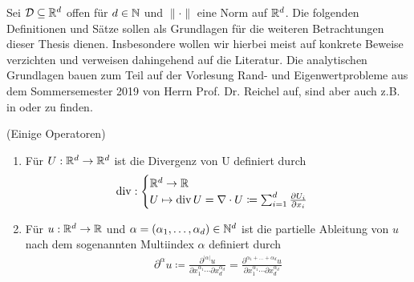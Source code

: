 Sei $\mathcal{D} \subseteq \mathbb{R}^d$ offen für $d\in \mathbb{N}$ und $\lVert \cdot \rVert$ eine Norm auf $\mathbb{R}^d$.
Die folgenden Definitionen und Sätze sollen als Grundlagen für die weiteren Betrachtungen dieser Thesis dienen. Insbesondere wollen wir hierbei meist auf konkrete Beweise verzichten und verweisen dahingehend auf die Literatur. 
Die analytischen Grundlagen bauen zum Teil auf der Vorlesung Rand- und Eigenwertprobleme aus dem Sommersemester 2019 von Herrn Prof. Dr. Reichel auf, sind aber auch  z.B. in \cite{dobrowolski2010angewandte} oder \cite{evans10} zu finden.
\begin{Definition}(Einige Operatoren)
	\begin{enumerate}[label=(\alph*)]
		\item Für $U: \mathbb{R}^d \to \mathbb{R}^d$ ist die Divergenz von U definiert durch
			\begin{align*}
				\operatorname{div}  : \begin{cases}
				\mathbb{R}^d  \to \mathbb{R} \\
				U \mapsto \operatorname{div} U= \nabla \cdot  U \coloneqq \sum_{i=1}^{d} \frac{\partial U_i}{ \partial x_i}
				\end{cases}
			\end{align*}
		\item Für $u: \mathbb{R}^d \to \mathbb{R}$ und $\alpha = (\alpha_1,\dots,\alpha_d) \in \mathbb{N}^d$ ist die partielle Ableitung von $u$ nach dem sogenannten Multiindex $\alpha$ definiert durch
			\begin{align*}
				\partial^{\alpha}u \coloneqq 
				\frac{\partial^{|\alpha|} u}{\partial x_1 ^{\alpha_1} \cdots  \partial x_d^{\alpha_d} } 
				=\frac{\partial^{\alpha_1+\dots +\alpha_d} u}{\partial x_1 ^{\alpha_1} \cdots  \partial x_d^{\alpha_d} } 
			\end{align*}
	\end{enumerate}
\end{Definition}



